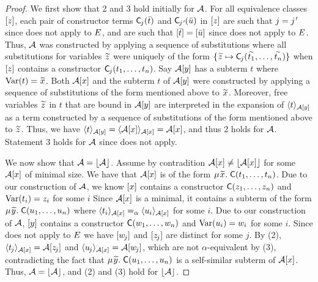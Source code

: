 \begin{rep}
\begin{proof}
We first show that 2 and 3 hold initially for $\Val$.
For all equivalence classes $\ec{z}$,
each pair of constructor terms $\const{C}_{\negvthinspace j}( \vec t )$ and $\const{C}_{\negvthinspace\jPrime}( \vec u )$ in $\ec{z}$
are such that $j = \jPrime$ since  does not apply to $\Ec$,
and are such that $\ec{ \vec t } = \ec{ \vec u }$ since  does not apply to $\Ec$.
Thus,
$\Val$ was constructed by applying a sequence of substitutions
where all substitutions for variables ${\Varec{z}}$
were uniquely of the form $\{ {\Varec{z}} \mapsto \const{C}_{\negvthinspace j}( {\Varec{t_1}}, \ldots, {\Varec{t_n}} ) \}$
when $\ec{z}$ contains a constructor $\const{C}_{\negvthinspace j}( t_1, \ldots, t_n )$.
Say $\Val \ec{y}$ has a subterm $t$ where $\muvar(t) = {\Varec{x}}$.
Both $\Val \ec{x}$ and the subterm $t$ of $\Val \ec{y}$ were
constructed by applying a sequence of substitutions of the form mentioned above to ${\Varec{x}}$.
Moreover, free variables ${\Varec{z}}$ in $t$ that are bound in $\Val \ec{y}$ are interpreted in
the expansion of $\interp{\Val \ec{y}}{ t }$ as a term
constructed by a sequence of substitutions of the form mentioned above to ${\Varec{z}}$. 
Thus, we have
$\interp{\Val \ec{y}}{ t } = \interp{\Val \ec{x}}{ \Val \ec{x} } = \Val \ec{x}$, and thus 2 holds for $\Val$.
Statement 3 holds for $\Val$ since  does not apply.

We now show that $\Val = \nf{\Val}$.
Assume by contradition $\Val \ec{x} \neq \nf{\Val \ec{x}}$ for some $\Val \ec{x}$ of minimal size.
We have that $\Val \ec{x}$ is of the form $\MU {\Varec{x}}.\; \const{C}( t_1, \ldots, t_n )$.
Due to our construction of $\Val$,
we know $\ec{x}$ contains a constructor $\const{C}( z_1, \ldots, z_n )$ and $\muvar( t_i ) = z_i$ for some $i$ %
Since $\Val \ec{x}$ is a minimal, it
contains a subterm of the form $\MU {\Varec{y}}.\; \const{C}( u_1, \ldots, u_n )$
where $\interp{\Val \ec{x}}{ t_i } \aequiv \interp{\Val \ec{x} }{ u_i }$ for some $i$. %
Due to our construction of $\Val$, $\ec{y}$ contains a constructor $\const{C}( w_1, \ldots, w_n )$ and $\muvar( u_i ) = w_i$ for some $i$. %
Since  does not apply to $\Ec$
we have $\ec{w_{\negvthinspace j}}$ and $\ec{z_{\negvthinspace j}}$ are distinct for some $j$.
By (2), $\interp{\Val \ec{x}}{ t_{\negvthinspace j} } = \Val \ec{z_{\negvthinspace j}}$
and $\interp{\Val \ec{x}}{ u_{\negvthinspace j} } = \Val \ec{w_{\negvthinspace j}}$,
which are not $\alpha$-equivalent by (3), contradicting the fact that $\MU {\Varec{y}}.\; \const{C}( u_1, \ldots, u_n )$ is a self-similar subterm of $\Val \ec{x}$.
Thus, $\Val = \nf{\Val}$, and (2) and (3) hold for $\nf{\Val}$.


\end{proof}
\end{rep}
